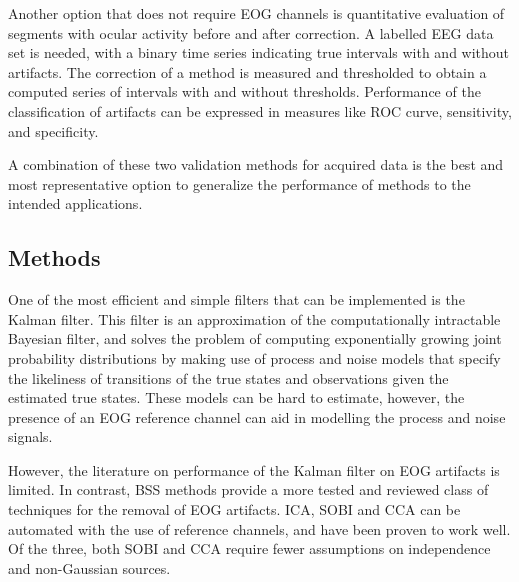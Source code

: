 \documentclass[twoside]{article}
\begin{document}
Another option that does not require EOG channels is quantitative evaluation of segments with ocular activity before and after correction. A labelled EEG data set is needed, with a binary time series indicating true intervals with and without artifacts. The correction of a method is measured and thresholded to obtain a computed series of intervals with and without thresholds. Performance of the classification of artifacts can be expressed in measures like ROC curve, sensitivity, and specificity. 

A combination of these two validation methods for acquired data is the best and most representative option to generalize the performance of methods to the intended applications.

\subsection{Methods}
One of the most efficient and simple filters that can be implemented is the Kalman filter. This filter is an approximation of the computationally intractable Bayesian filter, and solves the problem of computing exponentially growing joint probability distributions by making use of process and noise models that specify the likeliness of transitions of the true states and observations given the estimated true states. These models can be hard to estimate, however, the presence of an EOG reference channel can aid in modelling the process and noise signals.  

However, the literature on performance of the Kalman filter on EOG artifacts is limited. In contrast, BSS methods provide a more tested and reviewed class of techniques for the removal of EOG artifacts. ICA, SOBI and CCA can be automated with the use of reference channels, and have been proven to work well. Of the three, both SOBI and CCA require fewer assumptions on independence and non-Gaussian sources. 
\end{document}
